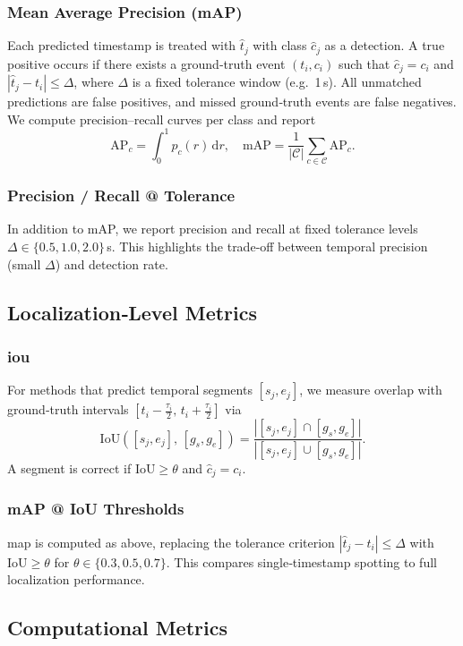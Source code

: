 \subsubsection{Mean Average Precision (mAP)}
Each predicted timestamp is treated with $\hat t_j$ with class $\hat c_j$ as a detection. A true positive occurs if there exists a ground‑truth event $(t_i,c_i)$ such that $\hat c_j = c_i$ and $|\hat t_j - t_i|\le\Delta$, where $\Delta$ is a fixed tolerance window (e.g.\ 1\,s). All unmatched predictions are false positives, and missed ground‑truth events are false negatives. We compute precision–recall curves per class and report
\[
\mathrm{AP}_c = \int_{0}^{1} p_c(r)\,\mathrm{d}r,\quad
\mathrm{mAP} = \frac{1}{|\mathcal{C}|}\sum_{c\in\mathcal{C}}\mathrm{AP}_c.
\]

\subsubsection{Precision / Recall @ Tolerance}
In addition to mAP, we report precision and recall at fixed tolerance levels $\Delta\in\{0.5,1.0,2.0\}$\,s. This highlights the trade‑off between temporal precision (small $\Delta$) and detection rate.

\subsection{Localization‑Level Metrics}
\subsubsection{\acrfull{iou}}
For methods that predict temporal segments $[s_j,e_j]$, we measure overlap with ground‑truth intervals $[t_i-\tfrac{\tau_i}{2},\,t_i+\tfrac{\tau_i}{2}]$ via
\[
\mathrm{IoU}([s_j,e_j],\,[g_s,g_e]) 
= \frac{|[s_j,e_j]\cap [g_s,g_e]|}{|[s_j,e_j]\cup [g_s,g_e]|}.
\]
A segment is correct if $\mathrm{IoU}\!\ge\theta$ and $\hat c_j=c_i$.

\subsubsection{mAP @ IoU Thresholds}
\acrshort{map} is computed as above, replacing the tolerance criterion $|\hat t_j - t_i|\le\Delta$ with $\mathrm{IoU}\ge\theta$ for $\theta\in\{0.3,0.5,0.7\}$. This compares single‑timestamp spotting to full localization performance.

\subsection{Computational Metrics} 
